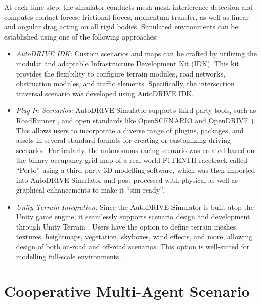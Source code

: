 \documentclass[letterpaper, 10 pt, conference]{ieeeconf}  %
\begin{document}
	At each time step, the simulator conducts mesh-mesh interference detection and computes contact forces, frictional forces, momentum transfer, as well as linear and angular drag acting on all rigid bodies. Simulated environments can be established using one of the following approaches:
	\begin{itemize}
		\item \textit{AutoDRIVE IDK:} Custom scenarios and maps can be crafted by utilizing the modular and adaptable Infrastructure Development Kit (IDK). This kit provides the flexibility to configure terrain modules, road networks, obstruction modules, and traffic elements. Specifically, the intersection traversal scenario was developed using AutoDRIVE IDK.
		
		\item \textit{Plug-In Scenarios:} AutoDRIVE Simulator supports third-party tools, such as RoadRunner \cite{RoadRunner2021}, and open standards like OpenSCENARIO \cite{OpenSCENARIO2021} and OpenDRIVE \cite{OpenDRIVE2021}). This allows users to incorporate a diverse range of plugins, packages, and assets in several standard formats for creating or customizing driving scenarios. Particularly, the autonomous racing scenario was created based on the binary occupancy grid map of a real-world F1TENTH racetrack called ``Porto'' using a third-party 3D modelling software, which was then imported into AutoDRIVE Simulator and post-processed with physical as well as graphical enhancements to make it ``sim-ready''.
		
		\item \textit{Unity Terrain Integration:} Since the AutoDRIVE Simulator is built atop the Unity \cite{Unity2021} game engine, it seamlessly supports scenario design and development through Unity Terrain \cite{UnityTerrain2021}. Users have the option to define terrain meshes, textures, heightmaps, vegetation, skyboxes, wind effects, and more, allowing design of both on-road and off-road scenarios. This option is well-suited for modelling full-scale environments.
	\end{itemize}
	
	
	\section{Cooperative Multi-Agent Scenario}
	\label{Section: Cooperative Multi-Agent Scenario}
	
\end{document}

